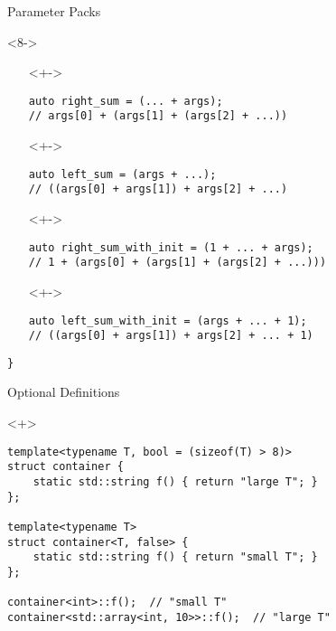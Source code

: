 \documentclass[table]{beamer}
\begin{document}
\begin{frame}[fragile]{Parameter Packs}
  \begin{onlyenv}<8->
    \begin{itemize}
    \item[]<+->
      \begin{verbatim}
auto right_sum = (... + args); 
// args[0] + (args[1] + (args[2] + ...))
      \end{verbatim}    
    \item[]<+->
      \begin{verbatim}
auto left_sum = (args + ...);
// ((args[0] + args[1]) + args[2] + ...)
      \end{verbatim}    
    \item[]<+->
      \begin{verbatim}
auto right_sum_with_init = (1 + ... + args); 
// 1 + (args[0] + (args[1] + (args[2] + ...)))
      \end{verbatim}    
    \item[]<+->
      \begin{verbatim}
auto left_sum_with_init = (args + ... + 1);
// ((args[0] + args[1]) + args[2] + ... + 1)
      \end{verbatim}    
    \end{itemize}
  \end{onlyenv}
  
  \begin{verbatim}
}
  \end{verbatim}
\end{frame}

\begin{frame}[fragile]{Optional Definitions}
  \begin{onlyenv}<+>
    \begin{verbatim}
template<typename T, bool = (sizeof(T) > 8)>
struct container {
    static std::string f() { return "large T"; }
};

template<typename T>
struct container<T, false> {
    static std::string f() { return "small T"; }
};

container<int>::f();  // "small T"
container<std::array<int, 10>>::f();  // "large T"
    \end{verbatim}
  \end{onlyenv}
\end{frame}
\end{document}

